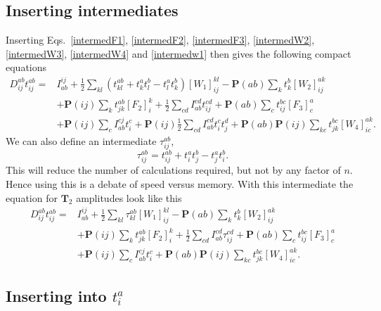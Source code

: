 \documentclass[a4paper,norsk,11pt,twoside]{report}
\begin{document}
\subsection{Inserting intermediates}
Inserting Eqs.~\eqref{intermedF1}, \eqref{intermedF2}, \eqref{intermedF3}, \eqref{intermedW2}, \eqref{intermedW3}, \eqref{intermedW4} and \eqref{intermedw1} then gives  the following compact equations
\begin{align}
D_{ij}^{ab} t_{ij}^{ab} = & 
I_{ab}^{ij} +
\frac{1}{2} \sum_{kl} (t_{kl}^{ab} + t_k^a t_l^b - t_l^a t_k^b) [W_1]_{ij}^{kl}
- \textbf{P}(ab) \sum_k t_k^b [W_2]_{ij}^{ak}
\nonumber \\ &
+ \textbf{P}(ij) \sum_k t_{jk}^{ab} [F_2]_i^k
+ \frac{1}{2} \sum_{cd} I_{ab}^{cd} t_{ij}^{cd}
+ \textbf{P}(ab) \sum_c t_{ij}^{bc} [F_3]_c^a
\nonumber \\ &
+ \textbf{P}(ij) \sum_c I_{ab}^{cj} t_i^c
+ \textbf{P}(ij) \frac{1}{2} \sum_{cd} I_{ab}^{cd} t_i^c t_j^d 
+ \textbf{P}(ab) \textbf{P}(ij) \sum_{kc} t_{jk}^{bc} [W_4]_{ic}^{ak} .
\end{align}
We can also define an intermediate $\tau_{ij}^{ab}$, 
\begin{equation}
\tau_{ij}^{ab} = t_{ij}^{ab} + t_i^a t_j^b - t_j^a t_i^b . \label{intermedtau}
\end{equation}
This will reduce the number of calculations required, but not by any factor of $n$. Hence using this is a debate of speed versus memory. With this intermediate the equation for $\textbf{T}_2$ amplitudes look like this
\begin{align}
D_{ij}^{ab} t_{ij}^{ab} = & 
I_{ab}^{ij} +
\frac{1}{2} \sum_{kl} \tau_{kl}^{ab} [W_1]_{ij}^{kl}
- \textbf{P}(ab) \sum_k t_k^b [W_2]_{ij}^{ak}
\nonumber \\ &
+ \textbf{P}(ij) \sum_k t_{jk}^{ab} [F_2]_i^k
+ \frac{1}{2} \sum_{cd} I_{ab}^{cd} \tau_{ij}^{cd}
+ \textbf{P}(ab) \sum_c t_{ij}^{bc} [F_3]_c^a
\nonumber \\ &
+ \textbf{P}(ij) \sum_c I_{ab}^{cj} t_i^c
+ \textbf{P}(ab) \textbf{P}(ij) \sum_{kc} t_{jk}^{bc} [W_4]_{ic}^{ak} . \label{LINK_THIS_SHIT_1_T2}
\end{align}

\subsection{Inserting into $t_i^a$}
\end{document}
